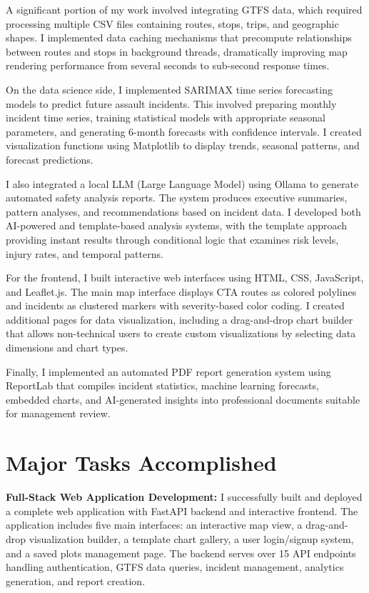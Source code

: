 \documentclass[12pt,letterpaper]{article}
\begin{document}
A significant portion of my work involved integrating GTFS data, which required processing multiple CSV files containing routes, stops, trips, and geographic shapes. I implemented data caching mechanisms that precompute relationships between routes and stops in background threads, dramatically improving map rendering performance from several seconds to sub-second response times.

On the data science side, I implemented SARIMAX time series forecasting models to predict future assault incidents. This involved preparing monthly incident time series, training statistical models with appropriate seasonal parameters, and generating 6-month forecasts with confidence intervals. I created visualization functions using Matplotlib to display trends, seasonal patterns, and forecast predictions.

I also integrated a local LLM (Large Language Model) using Ollama to generate automated safety analysis reports. The system produces executive summaries, pattern analyses, and recommendations based on incident data. I developed both AI-powered and template-based analysis systems, with the template approach providing instant results through conditional logic that examines risk levels, injury rates, and temporal patterns.

For the frontend, I built interactive web interfaces using HTML, CSS, JavaScript, and Leaflet.js. The main map interface displays CTA routes as colored polylines and incidents as clustered markers with severity-based color coding. I created additional pages for data visualization, including a drag-and-drop chart builder that allows non-technical users to create custom visualizations by selecting data dimensions and chart types.

Finally, I implemented an automated PDF report generation system using ReportLab that compiles incident statistics, machine learning forecasts, embedded charts, and AI-generated insights into professional documents suitable for management review.

\section{Major Tasks Accomplished}

\textbf{Full-Stack Web Application Development:} I successfully built and deployed a complete web application with FastAPI backend and interactive frontend. The application includes five main interfaces: an interactive map view, a drag-and-drop visualization builder, a template chart gallery, a user login/signup system, and a saved plots management page. The backend serves over 15 API endpoints handling authentication, GTFS data queries, incident management, analytics generation, and report creation.
\end{document}
